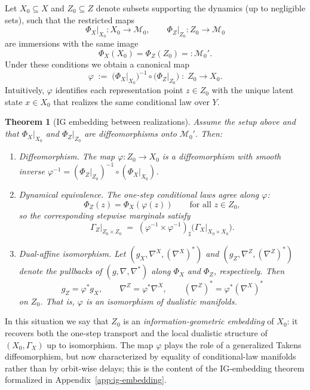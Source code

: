\documentclass[11pt]{article}
\newtheorem{theorem}{Theorem}
\newcommand{\1}{\mathbf{1}}
\begin{document}
Let $X_0 \subseteq X$ and $Z_0 \subseteq Z$ denote subsets supporting the dynamics (up to negligible sets), such that the restricted maps
\[
  \Phi_X\big|_{X_0} : X_0 \to \mathcal{M}_0,
  \qquad
  \Phi_Z\big|_{Z_0} : Z_0 \to \mathcal{M}_0
\]
are immersions with the same image
\[
  \Phi_X(X_0) = \Phi_Z(Z_0) =: \mathcal{M}_0'.
\]
Under these conditions we obtain a canonical map
\begin{equation}
  \varphi
  \;:=\;
  \bigl(\Phi_X\big|_{X_0}\bigr)^{-1} \circ \bigl(\Phi_Z\big|_{Z_0}\bigr)
  \;:\;
  Z_0 \longrightarrow X_0.
  \label{eq:ig-embedding-map}
\end{equation}
Intuitively, $\varphi$ identifies each representation point $z\in Z_0$ with the unique latent state $x\in X_0$ that realizes the same conditional law over $Y$.

\begin{theorem}[IG embedding between realizations]
\label{thm:ig-embedding}
Assume the setup above and that $\Phi_X|_{X_0}$ and $\Phi_Z|_{Z_0}$ are diffeomorphisms onto $\mathcal{M}_0'$. Then:
\begin{enumerate}[label=(E\arabic*),leftmargin=1.8em]
  \item \emph{Diffeomorphism.} The map $\varphi : Z_0\to X_0$ is a diffeomorphism with smooth inverse
        $\varphi^{-1} = (\Phi_Z|_{Z_0})^{-1}\circ(\Phi_X|_{X_0})$.
  \item \emph{Dynamical equivalence.} The one-step conditional laws agree along $\varphi$:
        \[
          \Phi_Z(z) = \Phi_X(\varphi(z))
          \qquad
          \text{for all } z\in Z_0,
        \]
        so the corresponding stepwise marginals satisfy
        \[
          \Gamma_Z\big|_{Z_0\times Z_0}
          \;=\;
          (\varphi^{-1}\times\varphi^{-1})_{\sharp}\bigl(\Gamma_X\big|_{X_0\times X_0}\bigr).
        \]
  \item \emph{Dual-affine isomorphism.} Let $(g_X,\nabla^X,(\nabla^X)^\ast)$ and
        $(g_Z,\nabla^Z,(\nabla^Z)^\ast)$ denote the pullbacks of $(g,\nabla,\nabla^\ast)$ along
        $\Phi_X$ and $\Phi_Z$, respectively. Then
        \[
          g_Z = \varphi^\ast g_X,
          \qquad
          \nabla^Z = \varphi^\ast \nabla^X,
          \qquad
          (\nabla^Z)^\ast = \varphi^\ast (\nabla^X)^\ast
        \]
        on $Z_0$. That is, $\varphi$ is an isomorphism of dualistic manifolds.
\end{enumerate}
\end{theorem}

In this situation we say that $Z_0$ is an \emph{information-geometric embedding} of $X_0$: it recovers both the one-step transport and the local dualistic structure of $(X_0,\Gamma_X)$ up to isomorphism. The map $\varphi$ plays the role of a generalized Takens diffeomorphism, but now characterized by equality of conditional-law manifolds rather than by orbit-wise delays; this is the content of the IG-embedding theorem formalized in Appendix~\ref{app:ig-embedding}.
\end{document}
